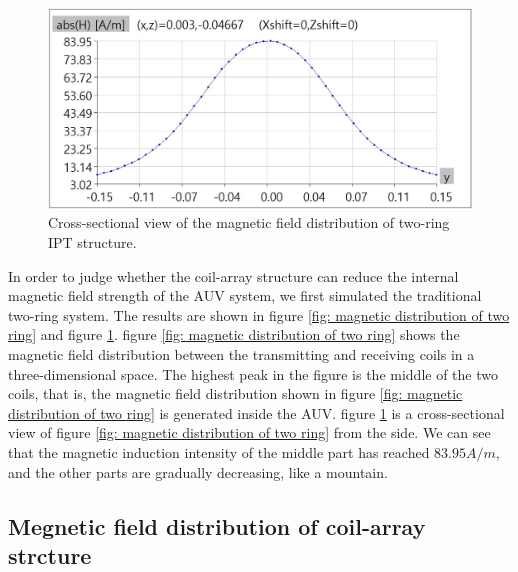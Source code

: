 \begin{figure}[!t]
    \centering
    \includegraphics[width=0.9\linewidth]{images/4_two_ring_near_field_distribution_cut.JPG}
    \caption{Cross-sectional view of the magnetic field distribution of two-ring IPT structure.}
    \label{fig: magnetic distribution of two ring cut}
\end{figure}


In order to judge whether the coil-array structure can reduce the internal magnetic field strength of the AUV system, we first simulated the traditional two-ring system.
The results are shown in figure \ref{fig: magnetic distribution of two ring} and figure \ref{fig: magnetic distribution of two ring cut}. figure \ref{fig: magnetic distribution of two ring} shows the magnetic field distribution between the transmitting and receiving coils in a three-dimensional space. The highest peak in the figure is the middle of the two coils, that is, the magnetic field distribution shown in figure \ref{fig: magnetic distribution of two ring} is generated inside the AUV. figure \ref{fig: magnetic distribution of two ring cut} is a cross-sectional view of figure \ref{fig: magnetic distribution of two ring} from the side. We can see that the magnetic induction intensity of the middle part has reached $83.95A/m$, and the other parts are gradually decreasing, like a mountain.

\subsection{Megnetic field distribution of coil-array strcture}

